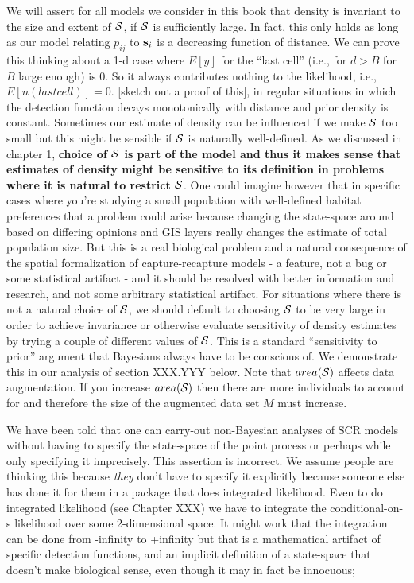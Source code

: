 We will assert for all models we consider in this book that density is
invariant to the size and extent of ${\cal S}$, if ${\cal S}$ is sufficiently large. In
fact, this only holds as long as our model relating $p_{ij}$ to ${\bf
  s}_{i}$ is a decreasing function of distance.  We can prove this
thinking about a 1-d case where $E[y]$ for the ``last cell'' (i.e.,
for $d>B$ for $B$ large enough) is 0. So it always contributes nothing to
the likelihood, i.e., $E[n(last cell)] = 0$. [sketch out a proof of
this], in regular situations in which the detection function decays
monotonically with distance and prior density is constant.  Sometimes
our estimate of density can be influenced if we make ${\cal S}$ too small but
this might be sensible if ${\cal S}$ is naturally well-defined. As we discussed
in chapter 1, {\bf choice of ${\cal S}$ is part of the model and thus it makes
  sense that estimates of density might be sensitive to its definition
  in problems where it is natural to restrict ${\cal S}$}.  
One could imagine
however that in specific cases where you're studying a small
population with well-defined habitat preferences that a problem could
arise because changing the state-space around based on differing
opinions and GIS layers really changes the estimate of total
population size. But this is a real biological problem and a natural
consequence of the spatial formalization of capture-recapture models -
a feature, not a bug or some statistical artifact - and it should be
resolved with better information and research, and not some arbitrary
statistical artifact.  For situations where there is not a natural
choice of ${\cal S}$, we should default to choosing ${\cal S}$ to be very large in order
to achieve invariance or otherwise evaluate sensitivity of density
estimates by trying a couple of different values of ${\cal S}$. This is a
standard ``sensitivity to prior'' argument that Bayesians always have
to be conscious of.  We demonstrate this in our analysis of section
XXX.YYY below. Note that $area({\cal S})$ affects data augmentation. If you
increase $area({\cal S})$ then there are more individuals to account for and
therefore the size of the augmented data set $M$ must increase.

We have been told that one can carry-out non-Bayesian analyses of SCR
models without having to specify the state-space of the point process
or perhaps while only specifying it imprecisely.  This assertion is
incorrect. We assume people are thinking this because {\it they} don't
have to specify it explicitly because someone else has done it for
them in a package that does integrated likelihood. Even to do
integrated likelihood (see Chapter XXX) we have to integrate the
conditional-on-s likelihood over some 2-dimensional space.  It might
work that the integration can be done from -infinity to +infinity but
that is a mathematical artifact of specific detection functions, and
an implicit definition of a state-space that doesn't make biological
sense, even though it may in fact be innocuous;


